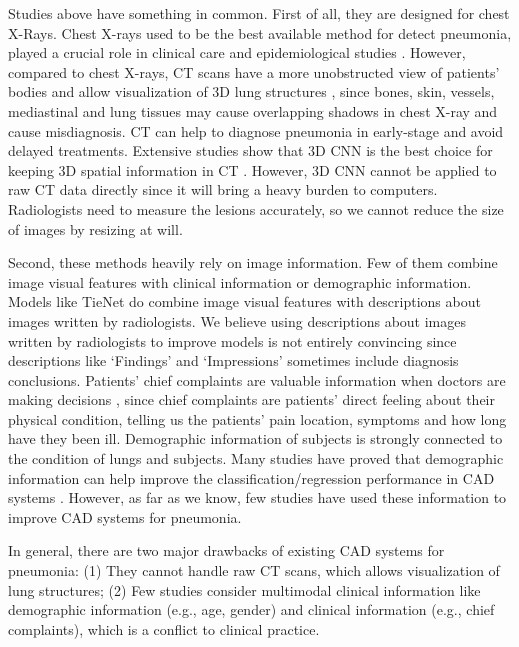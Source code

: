 \documentclass[journal]{IEEEtran}
\begin{document}
Studies above have something in common. First of all, they are designed for chest X-Rays. Chest X-rays used to be the best available method for detect pneumonia, played a crucial role in clinical care and epidemiological studies \cite{Franquet2001Imaging, Thomas2005Standardized}. 
However, compared to chest X-rays, CT scans have a more unobstructed view of patients' bodies and allow visualization of 3D lung structures \cite{korfiatis2009texture}, since bones, skin, vessels, mediastinal and lung tissues may cause overlapping shadows in chest X-ray and cause misdiagnosis. CT can help to diagnose pneumonia in early-stage and avoid delayed treatments.
Extensive studies show that 3D CNN is the best choice for keeping 3D spatial information in CT \cite{Yorozu1987Electron}. However, 3D CNN cannot be applied to raw CT data directly since it will bring a heavy burden to computers. Radiologists need to measure the lesions accurately, so we cannot reduce the size of images by resizing at will.

Second, these methods heavily rely on image information. Few of them combine image visual features with clinical information or demographic information. Models like TieNet do combine image visual features with descriptions about images written by radiologists. We believe using descriptions about images written by radiologists to improve models is not entirely convincing since descriptions like `Findings' and `Impressions' sometimes include diagnosis conclusions. Patients' chief complaints are valuable information when doctors are making decisions \cite{wu2018master}, since chief complaints are patients' direct feeling about their physical condition, telling us the patients' pain location, symptoms and how long have they been ill. 
Demographic information of subjects is strongly connected to the condition of lungs and subjects. Many studies have proved that demographic information can help improve the classification/regression performance in CAD systems \cite{frisoni2010clinical, coupe2012simultaneous, moradi2015machine, liu2018joint}. However, as far as we know, few studies have used these information to improve CAD systems for pneumonia. 

In general, there are two major drawbacks of existing CAD systems for pneumonia: (1) They cannot handle raw CT scans, which allows visualization of lung structures; (2) Few studies consider multimodal clinical information like demographic information (e.g., age, gender) and clinical information (e.g., chief complaints), which is a conflict to clinical practice.
\end{document}
